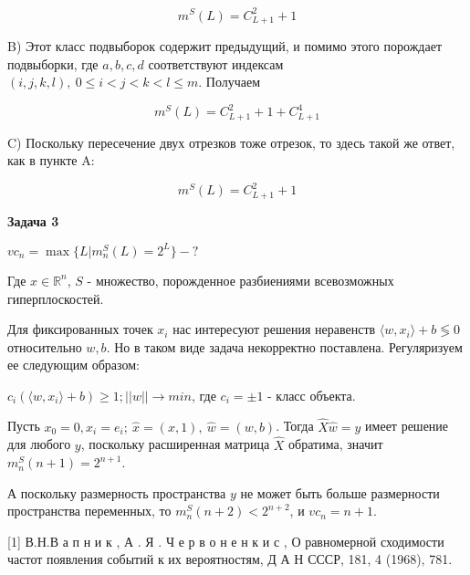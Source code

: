 \documentclass[10pt]{article}
\begin{document}
$$m^S(L) = C_{L+1}^2 + 1$$

\medskip
B) Этот класс подвыборок содержит предыдущий, и помимо этого порождает подвыборки, где $a,b,c,d$ соответствуют индексам $(i, j, k, l), \medspace 0 \leq i < j  < k < l \leq m$. Получаем 

$$m^S(L) = C_{L+1}^2 + 1  + C_{L+1}^4$$


\medskip
C) Поскольку пересечение двух отрезков тоже отрезок, то здесь такой же ответ, как в пункте A:

$$m^S(L) = C_{L+1}^2 + 1$$

\bigskip

\textbf{Задача 3}

\medskip

$vc_n = \max \{L|m^S_n(L) = 2^L\} - ?$

Где $x \in \mathbb{R}^n$, $S$ - множество, порожденное разбиениями всевозможных гиперплоскостей.
\medskip

Для фиксированных точек $x_i$ нас интересуют решения неравенств $\langle w,x_i\rangle + b \lessgtr 0$ относительно $w, b$. Но в таком виде задача некорректно поставлена. Регуляризуем ее следующим образом:

$c_i(\langle w,x_i\rangle + b) \geq 1; ||w|| \rightarrow min$, где $c_i = \pm 1$ - класс объекта.

Пусть $x_0 = 0, x_i = e_i; \medspace \hat{x}=(x,1) , \medspace \hat{w} = (w,b)$. Тогда $\hat{X}\hat{w} = y$ имеет решение для любого $y$, поскольку расширенная матрица $\hat{X}$ обратима, значит $m^S_n(n+1) = 2^{n+1}$.

\medskip

А поскольку размерность пространства $y$ не может быть больше размерности пространства переменных, то $m^S_n(n+2) < 2^{n+2}$, и $vc_n = n+1$.

\bigskip
\bigskip

[1]  В.Н.В а п н и к , А . Я . Ч е р в о н е н к и с , О равномерной сходимости частот появления событий к их вероятностям, Д А Н СССР, 181, 4 (1968), 781.
	
\end{document}
